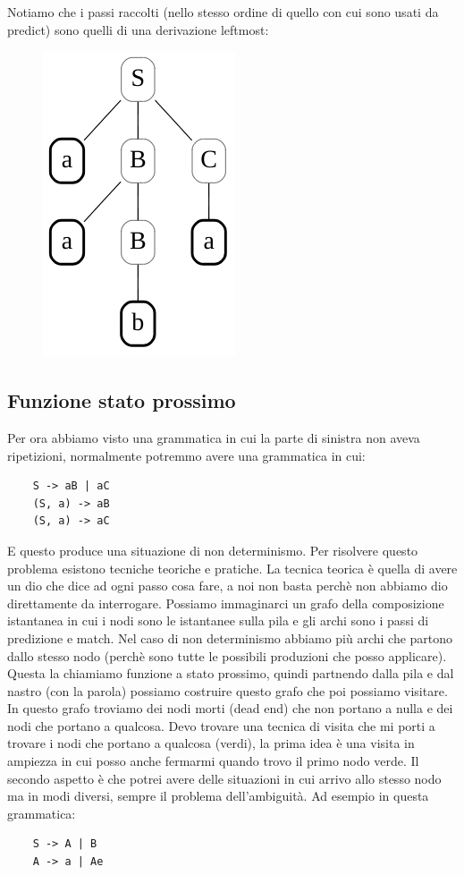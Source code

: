 Notiamo che i passi raccolti (nello stesso ordine di quello con cui sono usati da predict) sono quelli di una derivazione leftmost:

\begin{figure}[ht!]
  \centering
  \includegraphics[scale=0.5]{images/Parsing/derivazioneLeftmostTopDown.png}
\end{figure}

\subsection{Funzione stato prossimo}
Per ora abbiamo visto una grammatica in cui la parte di sinistra non aveva ripetizioni, normalmente potremmo avere una grammatica in cui:
\begin{lstlisting}
    S -> aB | aC
    (S, a) -> aB
    (S, a) -> aC
\end{lstlisting}

E questo produce una situazione di non determinismo. Per risolvere questo problema esistono tecniche teoriche e pratiche. La tecnica teorica è quella di avere un dio che dice ad ogni passo cosa fare, a noi non basta perchè non abbiamo dio direttamente da interrogare.
Possiamo immaginarci un grafo della composizione istantanea in cui i nodi sono le istantanee sulla pila e gli archi sono i passi di predizione e match. Nel caso di non determinismo abbiamo più archi che partono dallo stesso nodo (perchè sono tutte le possibili produzioni che posso applicare). Questa la chiamiamo funzione a stato prossimo, quindi partnendo dalla pila e dal nastro (con la parola) possiamo costruire questo grafo che poi possiamo visitare. In questo grafo troviamo dei nodi morti (dead end) che non portano a nulla e dei nodi che portano a qualcosa.
Devo trovare una tecnica di visita che mi porti a trovare i nodi che portano a qualcosa (verdi), la prima idea è una visita in ampiezza in cui posso anche fermarmi quando trovo il primo nodo verde.
Il secondo aspetto è che potrei avere delle situazioni in cui arrivo allo stesso nodo ma in modi diversi, sempre il problema dell'ambiguità. Ad esempio in questa grammatica:
\begin{lstlisting}
    S -> A | B
    A -> a | Ae
\end{lstlisting}

